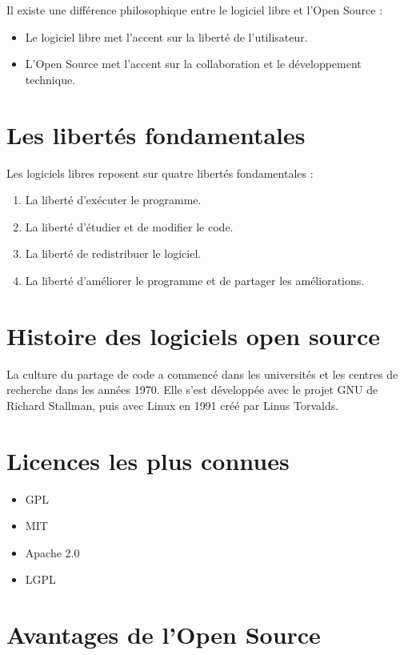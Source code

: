 \documentclass[12pt,a4paper]{report}
\begin{document}
Il existe une différence philosophique entre le logiciel libre et l’Open Source :

\begin{itemize}
    \item Le logiciel libre met l’accent sur la liberté de l’utilisateur.
    \item L’Open Source met l’accent sur la collaboration et le développement technique.
\end{itemize}

\section{Les libertés fondamentales}

Les logiciels libres reposent sur quatre libertés fondamentales :

\begin{enumerate}
    \item La liberté d’exécuter le programme.
    \item La liberté d’étudier et de modifier le code.
    \item La liberté de redistribuer le logiciel.
    \item La liberté d’améliorer le programme et de partager les améliorations.
\end{enumerate}

\section{Histoire des logiciels open source}

La culture du partage de code a commencé dans les universités et les centres de recherche dans les années 1970.  
Elle s’est développée avec le projet GNU de Richard Stallman, puis avec Linux en 1991 créé par Linus Torvalds.

\section{Licences les plus connues}

\begin{itemize}
    \item GPL
    \item MIT
    \item Apache 2.0
    \item LGPL
\end{itemize}

\section{Avantages de l’Open Source}
\end{document}
